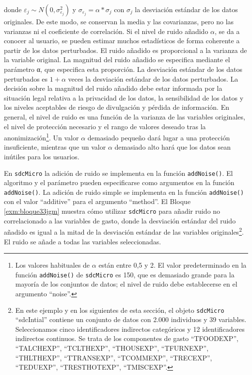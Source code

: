 \documentclass[
]{book}
\theoremstyle{definition}
\theoremstyle{definition}
\theoremstyle{definition}
\theoremstyle{definition}
\theoremstyle{remark}
\begin{document}
donde \(\varepsilon_{j} \sim N(0, \sigma_{\varepsilon_{j}}^{2})\) y \(\sigma_{\varepsilon_{j}} = \alpha * \sigma_{j}\) con \(\sigma_{j}\) la desviación estándar de los datos originales. De este modo, se conservan la media y las covarianzas, pero no las varianzas ni el coeficiente de correlación. Si el nivel de ruido añadido \(\alpha\), se da a conocer al usuario, se pueden estimar muchos estadísticos de forma coherente a partir de los datos perturbados. El ruido añadido es proporcional a la varianza de la variable original. La magnitud del ruido añadido se especifica mediante el parámetro α, que especifica esta proporción. La desviación estándar de los datos perturbados es \(1 + \alpha\) veces la desviación estándar de los datos perturbados. La decisión sobre la magnitud del ruido añadido debe estar informada por la situación legal relativa a la privacidad de los datos, la sensibilidad de los datos y los niveles aceptables de riesgo de divulgación y pérdida de información. En general, el nivel de ruido es una función de la varianza de las variables originales, el nivel de protección necesario y el rango de valores deseado tras la anonimización\footnote{Los valores habituales de \(\alpha\) están entre 0,5 y 2. El valor predeterminado en la función \texttt{addNoise()} de \texttt{sdcMicro} es 150, que es demasiado grande para la mayoría de los conjuntos de datos; el nivel de ruido debe establecerse en el argumento ``noise''.}. Un valor \(\alpha\) demasiado pequeño dará lugar a una protección insuficiente, mientras que un valor \(\alpha\) demasiado alto hará que los datos sean inútiles para los usuarios.

En \texttt{sdcMicro} la adición de ruido se implementa en la función \texttt{addNoise()}. El algoritmo y el parámetro pueden especificarse como argumentos en la función \texttt{addNoise()}. La adición de ruido simple se implementa en la función \texttt{addNoise()} con el valor ``additive'' para el argumento ``method''. El Bloque \ref{exm:bloque33jgm} muestra cómo utilizar \texttt{sdcMicro} para añadir ruido no correlacionado a las variables de gasto, donde la desviación estándar del ruido añadido es igual a la mitad de la desviación estándar de las variables originales\footnote{En este ejemplo y en los siguientes de esta sección, el objeto \texttt{sdcMicro} ``sdcIntial'' contiene un conjunto de datos con 2.000 individuos y 39 variables. Seleccionamos cinco identificadores indirectos categóricos y 12 identificadores indirectos continuos. Se trata de los componentes de gasto ``TFOODEXP'', ``TALCHEXP'', ``TCLTHEXP'', ``THOUSEXP'', ``TFURNEXP'', ``THLTHEXP'', ``TTRANSEXP'', ``TCOMMEXP'', ``TRECEXP'', ``TEDUEXP'', ``TRESTHOTEXP'', ``TMISCEXP''.}. El ruido se añade a todas las variables seleccionadas.
\end{document}
